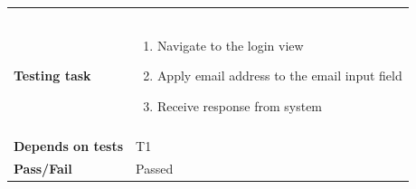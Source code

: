 \begin{appendices}
\begin{table}[H]
\begin{tabular}{ | l | l  |}
\begin{minipage}{5in}
\begin{itemize}[noitemsep]
			\end{itemize} \end{minipage}
			 \\ &\\[-3.8ex]\hline&\\[-3.8ex]
			\textbf{Testing task} & \begin{minipage}{5in}
			\begin{enumerate}[noitemsep]
			\item Navigate to the login view
			\item Apply email address to the email input field
			\item Receive response from system
			\end{enumerate}\end{minipage}
			 \\ &\\[-3.8ex]\hline
			\textbf{Depends on tests} & T1 \\ \hline					
			\textbf{Pass/Fail} & Passed \\\hline
		\end{tabular}
	
	\label{Tab_systemTesting2}
	\end{table}


\end{appendices}

